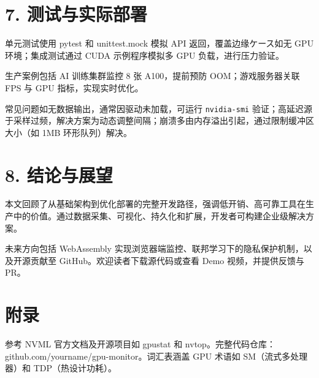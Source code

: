 \chapter{7. 测试与实际部署}
单元测试使用 pytest 和 unittest.mock 模拟 API 返回，覆盖边缘ケース如无 GPU 环境；集成测试通过 CUDA 示例程序模拟多 GPU 负载，进行压力验证。\par
生产案例包括 AI 训练集群监控 8 张 A100，提前预防 OOM；游戏服务器关联 FPS 与 GPU 指标，实现实时优化。\par
常见问题如无数据输出，通常因驱动未加载，可运行 \texttt{nvidia-smi} 验证；高延迟源于采样过频，解决方案为动态调整间隔；崩溃多由内存溢出引起，通过限制缓冲区大小（如 1MB 环形队列）解决。\par
\chapter{8. 结论与展望}
本文回顾了从基础架构到优化部署的完整开发路径，强调低开销、高可靠工具在生产中的价值。通过数据采集、可视化、持久化和扩展，开发者可构建企业级解决方案。\par
未来方向包括 WebAssembly 实现浏览器端监控、联邦学习下的隐私保护机制，以及开源贡献至 GitHub。欢迎读者下载源代码或查看 Demo 视频，并提供反馈与 PR。\par
\chapter{附录}
参考 NVML 官方文档及开源项目如 gpustat 和 nvtop。完整代码仓库：github.com/yourname/gpu-monitor。词汇表涵盖 GPU 术语如 SM（流式多处理器）和 TDP（热设计功耗）。\par

